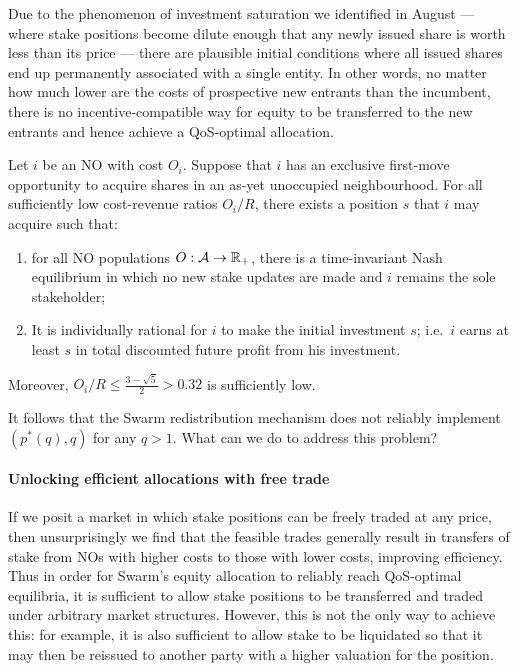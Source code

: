 Due to the phenomenon of investment saturation we identified in August --- where stake positions become dilute enough that any newly issued share is worth less than its price --- there are plausible initial conditions where all issued shares end up permanently associated with a single entity.
%
In other words, no matter how much lower are the costs of prospective new entrants than the incumbent, there is no incentive-compatible way for equity to be transferred to the new entrants and hence achieve a QoS-optimal allocation.

\begin{proposition*}
  Let $i$ be an NO with cost $O_i$. 
  Suppose that $i$ has an exclusive first-move opportunity to acquire shares in an as-yet unoccupied neighbourhood.
  For all sufficiently low cost-revenue ratios $O_i/R$, there exists a position $s$ that $i$ may acquire such that:
  \begin{enumerate}
    \item for all NO populations $O:\mathcal{A}\rightarrow\mathbb{R}_+$, there is a time-invariant Nash equilibrium in which no new stake updates are made and $i$ remains the sole stakeholder;
    \item It is individually rational for $i$ to make the initial investment $s$; i.e.~$i$ earns at least $s$ in total discounted future profit from his investment.
  \end{enumerate}
  Moreover, $O_i/R\leq \frac{3-\sqrt{5}}{2}> 0.32$ is sufficiently low.
\end{proposition*}

It follows that the Swarm redistribution mechanism does not reliably implement $(p^*(q),q)$ for any $q>1$.
%
What can we do to address this problem?

\paragraph{Unlocking efficient allocations with free trade}
If we posit a market in which stake positions can be freely traded at any price, then unsurprisingly we find that the feasible trades generally result in transfers of stake from NOs with higher costs to those with lower costs, improving efficiency.
%
Thus in order for Swarm's equity allocation to reliably reach QoS-optimal equilibria, it is sufficient to allow stake positions to be transferred and traded under arbitrary market structures.
%
However, this is not the only way to achieve this: for example, it is also sufficient to allow stake to be liquidated so that it may then be reissued to another party with a higher valuation for the position.

